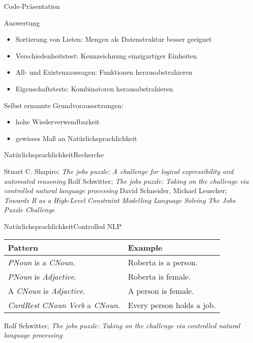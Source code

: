 \documentclass[hyperref={pdfpagelabels=false}]{beamer}
\begin{document}
\begin{frame}
\centering
\Huge \color{darkblue} Code-Pr\"asentation
\end{frame}

\begin{frame}{Auswertung}
\begin{itemize}
\item Sortierung von Listen: Mengen als Datenstruktur besser geeignet
\item Verschiedenheitstest: Kennzeichnung einzigartiger Einheiten
\item All- und Existenzaussagen: Funktionen herausabstrahieren
\item Eigenschaftstests: Kombinatoren herausabstrahieren
\end{itemize}
\pause
Selbst ernannte Grundvoraussetzungen:
\begin{itemize}
\item hohe Wiederverwendbarkeit
\item gewisses Ma\ss{} an Nat\"urlichsprachlichkeit
\end{itemize}
\end{frame}

\begin{frame}{Nat\"urlichsprachlichkeit}{Recherche}

Stuart C. Shapiro; \emph{The jobs puzzle: A challenge for logical expressibility and automated
reasoning}
\vfill
Rolf Schwitter; \emph{The jobs puzzle: Taking on the challenge via controlled natural language processing}
\vfill
David Schneider, Michael Leuscher; \emph{Towards B as a
High-Level Constraint Modelling Language Solving The Jobs Puzzle
Challenge}
\end{frame}

\begin{frame}{Nat\"urlichsprachlichkeit}{Controlled NLP}
\begin{tabular}{ll}
\hline
\hline
\large \textbf{Pattern} & \large\textbf{Example}\\
\hline
\emph{PNoun} is a \emph{CNoun}. & Roberta is a person.\\
\emph{PNoun} is \emph{Adjactive}.& Roberta is female.\\
A \emph{CNoun} is \emph{Adjactive}. & A person is female.\\
\emph{CardRest} \emph{CNoun} \emph{Verb} a \emph{CNoun}.
 & Every person holds a job. \\
\hline
\hline
\end{tabular}
\vfill
\footnotesize Rolf Schwitter; \emph{The jobs puzzle: Taking on the challenge via controlled natural language processing}
\end{frame}
\end{document}
